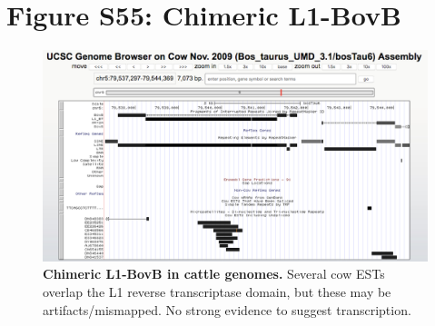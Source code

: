 \documentclass[12pt,a4paper,times]{article}
\begin{document}
\section*{Figure S55: Chimeric L1-BovB}

\begin{figure}[H]
	\centering
	\includegraphics[scale=0.5]{suppFigures/chimeric/rearranged.png}
	\caption{\footnotesize \textbf{Chimeric L1-BovB in cattle genomes. }Several cow ESTs overlap the L1 reverse transcriptase domain, but these may be artifacts/mismapped. No strong evidence to suggest transcription.} \label{Chimeric}
\end{figure}
	
\end{document}
